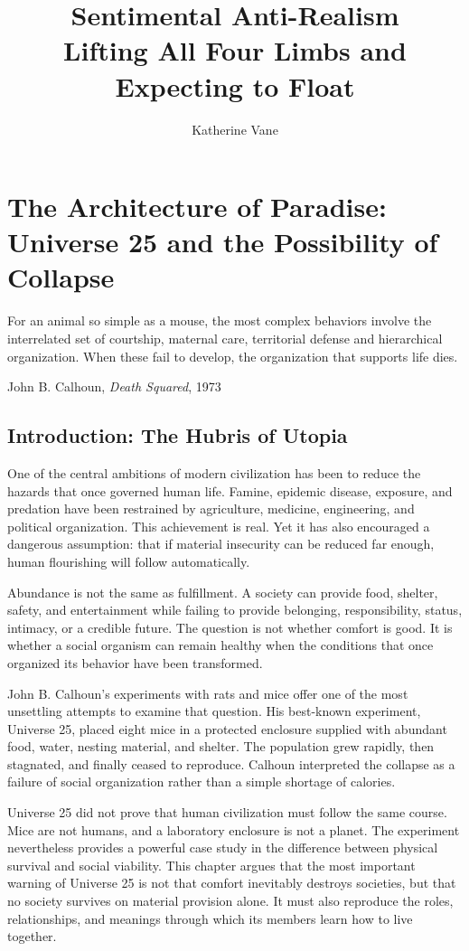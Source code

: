﻿\documentclass[12pt,a4paper]{book}
\title{Sentimental Anti-Realism\\[0.6em]
\large Lifting All Four Limbs and Expecting to Float}
\author{Katherine Vane}
\date{}
\begin{document}
\maketitle
\tableofcontents


\chapter[Universe 25 and the Possibility of Collapse]{The Architecture of Paradise: Universe 25 and the Possibility of Collapse}

\epigraph{For an animal so simple as a mouse, the most complex behaviors involve the interrelated set of courtship, maternal care, territorial defense and hierarchical organization. When these fail to develop, the organization that supports life dies.}{John B. Calhoun, \emph{Death Squared}, 1973 \cite{calhoun1973}}

\section{Introduction: The Hubris of Utopia}

One of the central ambitions of modern civilization has been to reduce the hazards that once governed human life. Famine, epidemic disease, exposure, and predation have been restrained by agriculture, medicine, engineering, and political organization. This achievement is real. Yet it has also encouraged a dangerous assumption: that if material insecurity can be reduced far enough, human flourishing will follow automatically.

Abundance is not the same as fulfillment. A society can provide food, shelter, safety, and entertainment while failing to provide belonging, responsibility, status, intimacy, or a credible future. The question is not whether comfort is good. It is whether a social organism can remain healthy when the conditions that once organized its behavior have been transformed.

John B. Calhoun's experiments with rats and mice offer one of the most unsettling attempts to examine that question. His best-known experiment, Universe 25, placed eight mice in a protected enclosure supplied with abundant food, water, nesting material, and shelter. The population grew rapidly, then stagnated, and finally ceased to reproduce. Calhoun interpreted the collapse as a failure of social organization rather than a simple shortage of calories.

Universe 25 did not prove that human civilization must follow the same course. Mice are not humans, and a laboratory enclosure is not a planet. The experiment nevertheless provides a powerful case study in the difference between physical survival and social viability. This chapter argues that the most important warning of Universe 25 is not that comfort inevitably destroys societies, but that no society survives on material provision alone. It must also reproduce the roles, relationships, and meanings through which its members learn how to live together.
\end{document}
